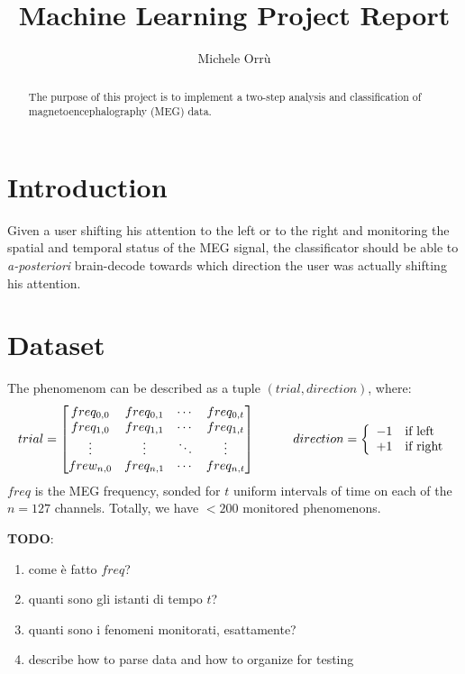 \documentclass[10pt]{article}
\title{\textbf{Machine Learning Project Report }}
\author{Michele Orr\`u}
\begin{document}
\maketitle

\begin{abstract}
The purpose of this project is to implement a two-step analysis and classification of magnetoencephalography (MEG) data. 
\end{abstract}



\section{Introduction}
Given a user shifting his attention to the left or to the right and monitoring the spatial and temporal status of the MEG signal, the classificator should be able to \textit{a-posteriori} brain-decode towards which direction the user was actually shifting his attention.



\section{Dataset}
The phenomenom can be described as a tuple $(trial, direction)$, where:
$$
trial  = 
 \begin{bmatrix}
   freq_{0, 0} & freq_{0, 1} & \cdots & freq_{0, t}  \\
   freq_{1, 0} & freq_{1, 1} & \cdots & freq_{1, t}  \\
   \vdots      & \vdots      & \ddots & \vdots       \\
   frew_{n, 0} & freq_{n, 1} & \cdots & freq_{n, t} 
 \end{bmatrix}
\hspace{30pt}
 direction = \left\{
 \begin{array}{l l}
   -1 & \text{if left}\\
   +1 & \text{if right}\\
 \end{array}\right .
$$
$freq$ is the MEG frequency, sonded for $t$ uniform intervals of time on each of the $n = 127$ channels.
Totally, we have $< 200$ monitored phenomenons.

\vspace{10in}
\textbf{TODO}:
\begin{enumerate}
\item come \`e fatto $freq$?
\item quanti sono gli istanti di tempo $t$?
\item quanti sono i fenomeni monitorati, esattamente?
\item describe how to parse data and how to organize for testing
\end{enumerate}
\end{document}

